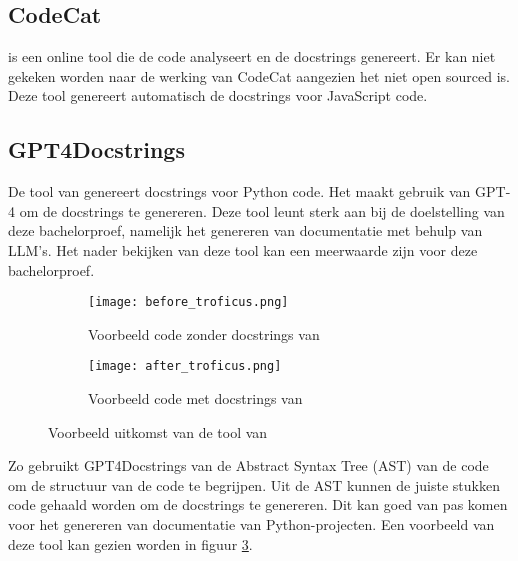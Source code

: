 \subsection{CodeCat}
\textcite{CodeCat2024} is een online tool die de code analyseert en de docstrings genereert. Er kan niet gekeken worden naar de werking van CodeCat aangezien het niet open sourced is.
Deze tool genereert automatisch de docstrings voor JavaScript code.

\subsection{GPT4Docstrings}
De tool van \textcite{Trofficus2023} genereert docstrings voor Python code. Het maakt gebruik van GPT-4 \autocite{OpenAI2023} om de docstrings te genereren.
Deze tool leunt sterk aan bij de doelstelling van deze bachelorproef, namelijk het genereren van documentatie met behulp van LLM's.
Het nader bekijken van deze tool kan een meerwaarde zijn voor deze bachelorproef.

\begin{figure}
  \centering
  \begin{subfigure}[b]{0.5\textwidth}
      \centering
      \texttt{[image: before\_troficus.png]}
      \caption{Voorbeeld code zonder docstrings van \textcite{Trofficus2023}}
      \label{fig:before-Trofficus}
  \end{subfigure}
  \hfill
  \begin{subfigure}[b]{0.5\textwidth}
      \centering
      \texttt{[image: after\_troficus.png]}
      \caption{Voorbeeld code met docstrings van \textcite{Trofficus2023}}
      \label{fig:after-Trofficus}
  \end{subfigure}
     \caption[Uitkomst GPT4Docstrings]{Voorbeeld uitkomst van de tool van \textcite{Trofficus2023}}
     \label{fig:Before-After-Trofficus}
\end{figure}

Zo gebruikt GPT4Docstrings van \textcite{Trofficus2023} de Abstract Syntax Tree (AST) van de code om de structuur van de code te begrijpen.
Uit de AST kunnen de juiste stukken code gehaald worden om de docstrings te genereren.
Dit kan goed van pas komen voor het genereren van documentatie van Python-projecten.
Een voorbeeld van deze tool kan gezien worden in figuur \ref{fig:Before-After-Trofficus}. 

